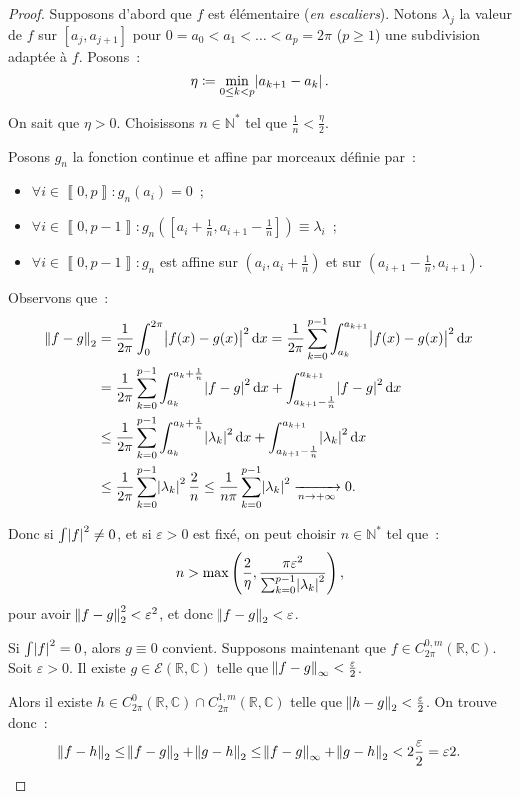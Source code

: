 \documentclass{report}
\theoremstyle{definition}
\theoremstyle{remark}
\numberwithin{equation}{section}
\newcommand{\C}{\mathbb C}
\newcommand{\R}{\mathbb R}
\newcommand{\N}{\mathbb N}
\newcommand{\Ns}{\N^{*}}
\newcommand{\El}[2]{\mathcal E\!\left(#1, #2\right)}
\newcommand{\intint}[2]{\left\llbracket#1, #2\right\rrbracket}
\newcommand{\pinfty}{{+\infty}}
\newcommand{\CmT}[2]{C^{#1,m}_{#2}}
\newcommand{\CzmT}[1]{\CmT 0{#1}}
\newcommand{\Czm}{\CzmT{2\pi}}
\begin{document}
			\begin{proof} Supposons d'abord que $f$ est élémentaire (\textit{en escaliers}). Notons $\lambda_j$ la valeur de $f$ sur $[a_j, a_{j+1}]$ pour
			$0 = a_0 < a_1 < \ldots < a_p = 2\pi$ ($p \geq 1$) une subdivision adaptée à $f$. Posons~:
			\begin{equation}
				\eta \coloneqq \min_{0 \leq k < p}\abs {a_{k+1}-a_k}.
			\end{equation}

			On sait que $\eta > 0$. Choisissons $n \in \Ns$ tel que $\frac 1n < \frac \eta2$.

			Posons $g_n$ la fonction continue et affine par morceaux définie par~:
			\begin{itemize}
				\item $\forall i \in \intint 0p : g_n(a_i) = 0$~;
				\item $\forall i \in \intint 0{p-1} : g_n\left([a_i + \frac 1n, a_{i+1} - \frac 1n]\right) \equiv \lambda_i$~;
				\item $\forall i \in \intint 0{p-1} : g_n$ est affine sur $(a_i, a_i+\frac 1n)$ et sur $(a_{i+1}-\frac 1n, a_{i+1})$.
			\end{itemize}

			Observons que~:
			\begin{align}
				\norm {f-g}_2 &= \frac 1{2\pi}\int_0^{2\pi}\abs {f(x)-g(x)}^2\dif x = \frac 1{2\pi}\sum_{k=0}^{p-1}\int_{a_k}^{a_{k+1}}\abs {f(x)-g(x)}^2\dif x \\
				&= \frac 1{2\pi}\sum_{k=0}^{p-1}\int_{a_k}^{a_k+\frac 1n}\abs {f-g}^2\dif x + \int_{a_{k+1}-\frac 1n}^{a_{k+1}}\abs {f-g}^2\dif x \\
				&\leq \frac 1{2\pi}\sum_{k=0}^{p-1}\int_{a_k}^{a_k+\frac 1n}\abs {\lambda_k}^2\dif x + \int_{a_{k+1}-\frac 1n}^{a_{k+1}}\abs {\lambda_k}^2\dif x \\
				&\leq \frac 1{2\pi}\sum_{k=0}^{p-1}\abs {\lambda_k}^2\frac 2n \leq \frac 1{n\pi}\sum_{k=0}^{p-1}\abs {\lambda_k}^2 \xrightarrow[n \to \pinfty]{} 0.
			\end{align}

			Donc si $\int \abs f^2 \neq 0$, et si $\varepsilon > 0$ est fixé, on peut choisir $n \in \Ns$ tel que~:
			\begin{equation}
				n > \max\left(\frac 2\eta, \frac {\pi\varepsilon^2}{\sum_{k=0}^{p-1}\abs {\lambda_k}^2}\right),
			\end{equation}
			pour avoir $\norm {f-g}_2^2 < \varepsilon^2$, et donc $\norm {f-g}_2 < \varepsilon$.

			Si $\int \abs f^2 = 0$, alors $g \equiv 0$ convient.
			Supposons maintenant que $f \in \Czm(\R, \C)$. Soit $\varepsilon > 0$. Il existe $g \in \El \R\C$ telle que $\norm {f-g}_\infty < \frac \varepsilon2$.

			Alors il existe $h \in C^0_{2\pi}(\R, \C) \cap C^{1,m}_{2\pi}(\R, \C)$ telle que $\norm {h-g}_2 < \frac \varepsilon2$. On trouve donc~:
			\begin{equation}
				\norm {f-h}_2 \leq \norm {f-g}_2 + \norm {g-h}_2 \leq \norm {f-g}_\infty + \norm {g-h}_2 < 2\frac \varepsilon2 = \varepsilon2.
			\end{equation}
			\end{proof}
\end{document}
